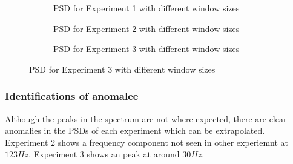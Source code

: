 \documentclass[main.tex]{subfiles}
\begin{document}
\begin{figure}[H]
	\centering
	
	\begin{subfigure}[b]{\textwidth}
		\centering
		\resizebox{\textwidth}{!}{}
		\caption{PSD for Experiment 1 with different window sizes}
		\label{fig:2-4-a-psd1}
	\end{subfigure}%
	
	\begin{subfigure}[b]{\textwidth}
		\centering
		\resizebox{\textwidth}{!}{}
		\caption{PSD for Experiment 2 with different window sizes}
		\label{fig:2-4-a-psd2}
	\end{subfigure}%
	
	\begin{subfigure}[b]{\textwidth}
		\centering
		\resizebox{\textwidth}{!}{}
		\caption{PSD for Experiment 3 with different window sizes}
		\label{fig:2-4-a-psd3}
	\end{subfigure}%
\end{figure}


\subsubsection{Identifications of anomalee}

Although the peaks in the spectrum are not where expected, there are clear anomalies in the PSDs of each experiment which can be extrapolated. Experiment 2 shows a frequency component not seen in other experiemnt at $123Hz$. Experiment 3 shows an peak at around $30Hz$. 

\pagebreak
\end{document}
